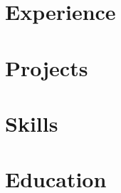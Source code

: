 \documentclass[11pt, letterpaper]{resume}
\let\\\relax %
\begin{document}

\makeprofile%

\begin{paracol}{2}






\section*{Experience}


\bigskip


\section*{Projects}


\switchcolumn%


\section*{Skills}


\bigskip


\section*{Education}
\begin{supertabular}{rl}


\end{supertabular}
\end{paracol}
\end{document}
